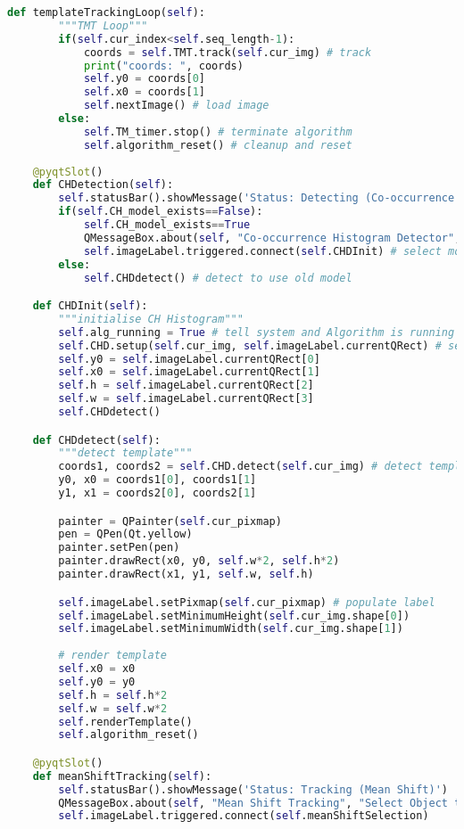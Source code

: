 \begin{lstlisting}[language=Python, caption={GUI Impementation Code}, captionpos=b, label={lst:gui}]
    def templateTrackingLoop(self):
        """TMT Loop"""
        if(self.cur_index<self.seq_length-1):
            coords = self.TMT.track(self.cur_img) # track    
            print("coords: ", coords)
            self.y0 = coords[0]
            self.x0 = coords[1]
            self.nextImage() # load image    
        else:
            self.TM_timer.stop() # terminate algorithm
            self.algorithm_reset() # cleanup and reset
    
    @pyqtSlot()
    def CHDetection(self):
        self.statusBar().showMessage('Status: Detecting (Co-occurrence Histogram)')
        if(self.CH_model_exists==False):
            self.CH_model_exists==True
            QMessageBox.about(self, "Co-occurrence Histogram Detector", "Select Object to Detect") 
            self.imageLabel.triggered.connect(self.CHDInit) # select model
        else:
            self.CHDdetect() # detect to use old model

    def CHDInit(self):
        """initialise CH Histogram"""
        self.alg_running = True # tell system and Algorithm is running
        self.CHD.setup(self.cur_img, self.imageLabel.currentQRect) # setup mean shift tracker with coords
        self.y0 = self.imageLabel.currentQRect[0]
        self.x0 = self.imageLabel.currentQRect[1]
        self.h = self.imageLabel.currentQRect[2]
        self.w = self.imageLabel.currentQRect[3]
        self.CHDdetect()

    def CHDdetect(self):
        """detect template"""
        coords1, coords2 = self.CHD.detect(self.cur_img) # detect template 
        y0, x0 = coords1[0], coords1[1]
        y1, x1 = coords2[0], coords2[1]

        painter = QPainter(self.cur_pixmap)
        pen = QPen(Qt.yellow)
        painter.setPen(pen)
        painter.drawRect(x0, y0, self.w*2, self.h*2)
        painter.drawRect(x1, y1, self.w, self.h)

        self.imageLabel.setPixmap(self.cur_pixmap) # populate label
        self.imageLabel.setMinimumHeight(self.cur_img.shape[0])
        self.imageLabel.setMinimumWidth(self.cur_img.shape[1])
        
        # render template
        self.x0 = x0
        self.y0 = y0
        self.h = self.h*2
        self.w = self.w*2
        self.renderTemplate()
        self.algorithm_reset()

    @pyqtSlot()
    def meanShiftTracking(self):
        self.statusBar().showMessage('Status: Tracking (Mean Shift)')
        QMessageBox.about(self, "Mean Shift Tracking", "Select Object to Track")
        self.imageLabel.triggered.connect(self.meanShiftSelection)


\end{lstlisting}
